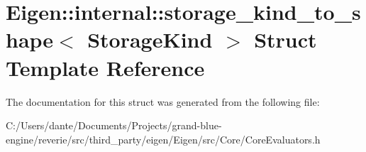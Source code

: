 \hypertarget{struct_eigen_1_1internal_1_1storage__kind__to__shape}{}\section{Eigen\+::internal\+::storage\+\_\+kind\+\_\+to\+\_\+shape$<$ Storage\+Kind $>$ Struct Template Reference}
\label{struct_eigen_1_1internal_1_1storage__kind__to__shape}


The documentation for this struct was generated from the following file\+:\begin{DoxyCompactItemize}
\item 
C\+:/\+Users/dante/\+Documents/\+Projects/grand-\/blue-\/engine/reverie/src/third\+\_\+party/eigen/\+Eigen/src/\+Core/Core\+Evaluators.\+h\end{DoxyCompactItemize}
